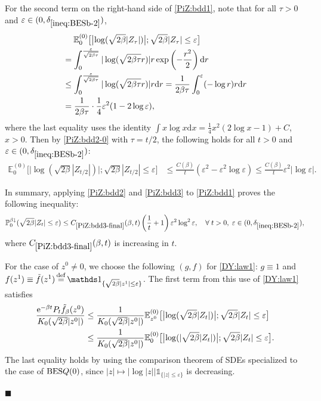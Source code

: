 \documentclass[12pt, twoside]{article}
\numberwithin{figure}{section}
\newcommand{\BES}{{\rm BES}}
\newcommand{\e}{{\mathrm e}}
\newcommand{\1}{\mathds 1}
\newcommand{\vep}{{\varepsilon}}
\newcommand{\da}{{\downarrow}}
\renewcommand{\P}{{\mathbb P}}
\newcommand{\E}{{\mathbb E}}
\renewcommand{\d}{{\mathrm d}}
\newcommand{\2}{{\mathbf 1}}
\newcommand{\defeq}{{\stackrel{\rm def}{=}}}
\renewenvironment{proof}[1][\proofname]{\noindent {\bfseries #1.}\;}{\hfill\ensuremath{\blacksquare}\\}
\newcommand{\deltaz}{\delta_{\ref{ineq:BESb-2}}}
\begin{document}
\begin{proof}[Proof of Lemma~\ref{lem:PiZbdd}]
For the second term on the right-hand side of \eqref{PiZ:bdd1}, note that
 for all $\tau>0$ and $\vep\in (0,\deltaz)$,
\begin{align}
&\quad\;\E^{(0)}_0\bigl[\bigl|\log (\sqrt{2\beta}|Z_\tau|)\bigr|;\sqrt{2\beta}|Z_\tau|\leq \vep\bigr]\notag\\
&=\int_0^{\frac{\vep}{\sqrt{2\beta\tau}}}|\log (\sqrt{2\beta \tau}r)| r\exp\left(-\frac{r^2}{2}\right)\d r \label{PiZ:ORG}\\
&\leq \int_0^{\frac{\vep}{\sqrt{2\beta\tau}}}|\log (\sqrt{2\beta \tau}r)| r\d r 
=\frac{1}{2\beta \tau}\int_0^\vep(-\log r)r\d r\notag\\
&=\frac{1}{2\beta\tau}\cdot \frac{1}{4}\vep^2(1-2\log \vep),
\label{PiZ:bdd2-0}
\end{align}
where the last equality uses the identity
$\int x\log x\d x=\frac{1}{4}x^2(2\log x-1)+C$, $x>0$.
Then by \eqref{PiZ:bdd2-0} with $\tau=t/2$, the following holds for all $t>0$ and $\vep\in (0,\deltaz)$:
\begin{align}
\E^{(0)}_0\bigl[\bigl|\log (\sqrt{2\beta}|Z_{t/2}|)\bigr|;\sqrt{2\beta}|Z_{t/2}|\leq \vep\bigr]
&\leq \frac{C(\beta)}{t}(\vep^2-\vep^2\log \vep)\leq \frac{C(\beta)}{t}\vep^2|\log \vep|.\label{PiZ:bdd3}
\end{align}

In summary, applying \eqref{PiZ:bdd2}  and \eqref{PiZ:bdd3} to \eqref{PiZ:bdd1} proves the following inequality:
\begin{align}\label{PiZ:bdd3-final}
\P^{\beta\da}_0(\sqrt{2\beta}|Z_t|\leq \vep)\leq C_{\ref{PiZ:bdd3-final}}(\beta,t)\left(\frac{1}{t}+1\right)\vep^2\log^2\vep,\quad \forall\;t>0,\;\vep\in (0,\deltaz),
\end{align}
where $C_{\ref{PiZ:bdd3-final}}(\beta,t)$ is increasing in $t$.\smallskip 


For the case of $z^0\neq 0$, we choose the following $(g,f)$ for \eqref{DY:law1}: $g\equiv 1$ and $f(z^1)\equiv \tilde{f}(z^1)\,\defeq\, \1_{\{\sqrt{2\beta}|z^1|\leq \vep\}}$. The first term from this use of \eqref{DY:law1} satisfies
\begin{align}
\frac{\e^{-\beta t}P_{t}\tilde{f}_\beta(z^0)}{K_0(\sqrt{2\beta}|z^0|)}&\leq \frac{1}{K_0(\sqrt{2\beta}|z^0|)} \E^{(0)}_{z^0}\bigl[\bigl|\log( \sqrt{2\beta}|Z_{t}|)\bigr|;\sqrt{2\beta}|Z_{t}|\leq \vep\bigr]\notag\\
&\leq \frac{1}{K_0(\sqrt{2\beta}|z^0|)} \E^{(0)}_{0}\bigl[\bigl|\log (|\sqrt{2\beta}|Z_{t}|)\bigr|;\sqrt{2\beta}|Z_{t}|\leq \vep\bigr].\label{PiZ:bddEE}
\end{align}
The last equality holds 
by using the comparison theorem of SDEs \cite[2.18 Proposition, p.293]{KS:BM} specialized to the case of $\BES Q(0)$,
since $|z|\mapsto |\log |z||\1_{\{|z|\leq \vep\}}$ is decreasing.


\end{proof}
\end{document}
